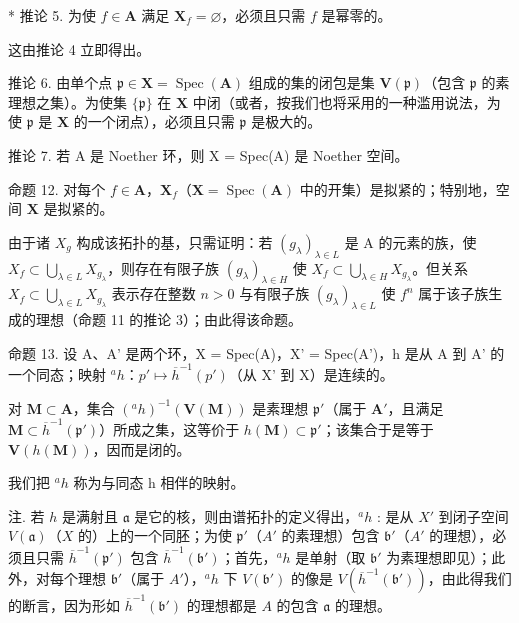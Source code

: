 * 推论 5. 为使 \(f \in \mathbf{A}\) 满足 \(\mathbf{X}_f = \varnothing\)，必须且只需 \(f\) 是幂零的。

这由推论 4 立即得出。

推论 6. 由单个点 \(\mathfrak{p} \in \mathbf{X} = \operatorname{Spec}(\mathbf{A})\) 组成的集的闭包是集 \(\mathbf{V}(\mathfrak{p})\)（包含 \(\mathfrak{p}\) 的素理想之集）。为使集 \(\{\mathfrak{p}\}\) 在 \(\mathbf{X}\) 中闭（或者，按我们也将采用的一种滥用说法，为使 \(\mathfrak{p}\) 是 \(\mathbf{X}\) 的一个闭点），必须且只需 \(\mathfrak{p}\) 是极大的。

推论 7. 若 A 是 Noether 环，则 X = Spec(A) 是 Noether 空间。

命题 12. 对每个 \(f \in \mathbf{A}\)，\(\mathbf{X}_f\)（\(\mathbf{X} = \operatorname{Spec}(\mathbf{A})\) 中的开集）是拟紧的；特别地，空间 \(\mathbf{X}\) 是拟紧的。

由于诸 \(X_{g}\) 构成该拓扑的基，只需证明：若 \((g_{\lambda})_{\lambda\in L}\) 是 A 的元素的族，使 \(X_{f}\subset\bigcup_{\lambda\in L}X_{g_{\lambda}}\)，则存在有限子族 \((g_{\lambda})_{\lambda\in H}\) 使 \(X_{f}\subset\bigcup_{\lambda\in H}X_{g_{\lambda}}\)。但关系 \(X_{f}\subset\bigcup_{\lambda\in L}X_{g_{\lambda}}\) 表示存在整数 \(n > 0\) 与有限子族 \((g_{\lambda})_{\lambda\in L}\) 使 \(f^{n}\) 属于该子族生成的理想（命题 11 的推论 3）；由此得该命题。

命题 13. 设 A、A' 是两个环，X = Spec(A)，X' = Spec(A')，h 是从 A 到 A' 的一个同态；映射 \(^a h\)：\(p' \mapsto \overline{h}^{-1}(p')\)（从 X' 到 X）是连续的。

对 \(\mathbf{M} \subset \mathbf{A}\)，集合 \((^a h)^{-1}(\mathbf{V}(\mathbf{M}))\) 是素理想 \(\mathfrak{p}'\)（属于 \(\mathbf{A}'\)，且满足 \(\mathbf{M} \subset \overline{h}^{-1}(\mathfrak{p}')\)）所成之集，这等价于 \(h(\mathbf{M}) \subset \mathfrak{p}'\)；该集合于是等于 \(\mathbf{V}(h(\mathbf{M}))\)，因而是闭的。

我们把 \(^{a}h\) 称为与同态 h 相伴的映射。

注. 若 \(h\) 是满射且 \(\mathfrak{a}\) 是它的核，则由谱拓扑的定义得出，\(^a h\) : 是从 \(X'\) 到闭子空间 \(V(\mathfrak{a})\)（\(X\) 的）上的一个同胚；为使 \(\mathfrak{p}'\)（\(A'\) 的素理想）包含 \(\mathfrak{b}'\)（\(A'\) 的理想），必须且只需 \(\overline{h}^{-1}(\mathfrak{p}')\) 包含 \(\overline{h}^{-1}(\mathfrak{b}')\)；首先，\(^a h\) 是单射（取 \(\mathfrak{b}'\) 为素理想即见）；此外，对每个理想 \(\mathfrak{b}'\)（属于 \(A'\)），\(^a h\) 下 \(V(\mathfrak{b}')\) 的像是 \(V(\overline{h}^{-1}(\mathfrak{b}'))\)，由此得我们的断言，因为形如 \(\overline{h}^{-1}(\mathfrak{b}')\) 的理想都是 \(A\) 的包含 \(\mathfrak{a}\) 的理想。

